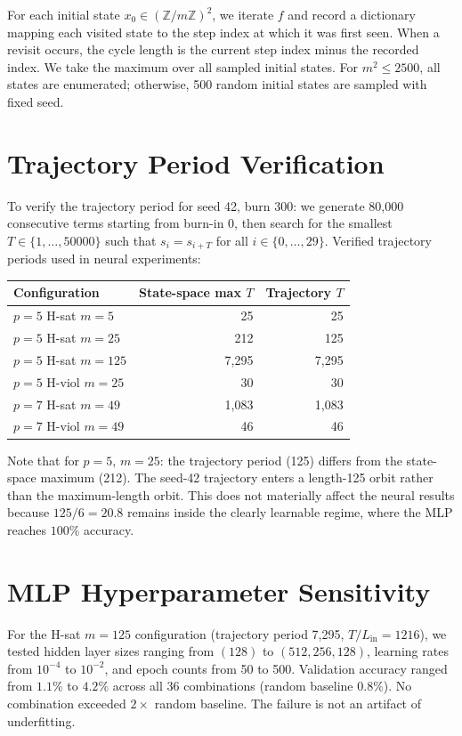 \documentclass[11pt]{article}
\theoremstyle{plain}
\theoremstyle{definition}
\newcommand{\Z}{\mathbb{Z}}
\begin{document}
For each initial state $x_0 \in (\Z/m\Z)^2$, we iterate $f$ and record a dictionary mapping each visited state to the step index at which it was first seen. When a revisit occurs, the cycle length is the current step index minus the recorded index. We take the maximum over all sampled initial states. For $m^2 \leq 2500$, all states are enumerated; otherwise, 500 random initial states are sampled with fixed seed.

\section{Trajectory Period Verification}
\label{app:traj}

To verify the trajectory period for seed 42, burn 300: we generate 80{,}000 consecutive terms starting from burn-in 0, then search for the smallest $T \in \{1,\ldots,50000\}$ such that $s_i = s_{i+T}$ for all $i \in \{0,\ldots,29\}$. Verified trajectory periods used in neural experiments:

\begin{center}
\begin{tabular}{@{}lrr@{}}
\toprule
Configuration & State-space max $T$ & Trajectory $T$\\
\midrule
$p=5$ H-sat $m=5$   & 25      & 25\\
$p=5$ H-sat $m=25$  & 212     & 125\\
$p=5$ H-sat $m=125$ & 7{,}295  & 7{,}295\\
$p=5$ H-viol $m=25$ & 30      & 30\\
$p=7$ H-sat $m=49$  & 1{,}083  & 1{,}083\\
$p=7$ H-viol $m=49$ & 46      & 46\\
\bottomrule
\end{tabular}
\end{center}

Note that for $p=5$, $m=25$: the trajectory period (125) differs from the state-space maximum (212). The seed-42 trajectory enters a length-125 orbit rather than the maximum-length orbit. This does not materially affect the neural results because $125/6 = 20.8$ remains inside the clearly learnable regime, where the MLP reaches $100\%$ accuracy.

\section{MLP Hyperparameter Sensitivity}
\label{app:mlp}

For the H-sat $m=125$ configuration (trajectory period 7{,}295, $T/L_{\mathrm{in}} = 1216$), we tested hidden layer sizes ranging from $(128)$ to $(512, 256, 128)$, learning rates from $10^{-4}$ to $10^{-2}$, and epoch counts from 50 to 500. Validation accuracy ranged from $1.1\%$ to $4.2\%$ across all 36 combinations (random baseline $0.8\%$). No combination exceeded $2\times$ random baseline. The failure is not an artifact of underfitting.
\end{document}
